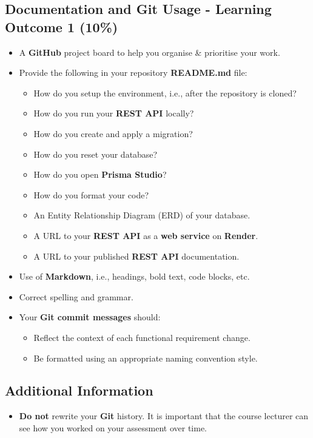 \documentclass{article}
\begin{document}
\subsection*{Documentation and Git Usage - Learning Outcome 1 (10\%)}
\begin{itemize}
	\item A \textbf{GitHub} project board to help you organise \& prioritise your work. 
    \item Provide the following in your repository \textbf{README.md} file:
    \begin{itemize} 
      \item How do you setup the environment, i.e., after the repository is cloned?
	  \item How do you run your \textbf{REST API} locally?
	  \item How do you create and apply a migration?  
	  \item How do you reset your database?
	  \item How do you open \textbf{Prisma Studio}?
	  \item How do you format your code?
	  \item An Entity Relationship Diagram (ERD) of your database.
	  \item A URL to your \textbf{REST API} as a \textbf{web service} on \textbf{Render}.
	  \item A URL to your published \textbf{REST API} documentation. 
    \end{itemize}
    \item Use of \textbf{Markdown}, i.e., headings, bold text, code blocks, etc.
    \item Correct spelling and grammar.
    \item Your \textbf{Git commit messages} should:
    \begin{itemize}
      \item Reflect the context of each functional requirement change.
      \item Be formatted using an appropriate naming convention style.
    \end{itemize}	
\end{itemize}

\subsection*{Additional Information}
\begin{itemize}
    \item \textbf{Do not} rewrite your \textbf{Git} history. It is important that the course lecturer can see how you worked on your assessment over time. 
\end{itemize} 
\end{document}
